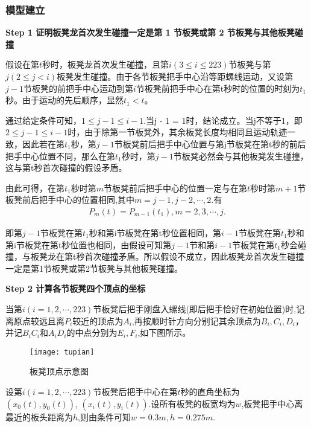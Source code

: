 \documentclass{cumcmthesis}
\begin{document}
\subsubsection{模型建立}
\noindent\textbf{Step 1 证明板凳龙首次发生碰撞一定是第 1 节板凳或第 2 节板凳与其他板凳碰撞}
 \par 假设在第$t$秒时，板凳龙首次发生碰撞，且第$i(3\leq i\leq 223)$节板凳与第$j(2\leq j<i)$板凳发生碰撞。由于各节板凳把手中心沿等距螺线运动，又设第$j-1$节板凳的前把手中心运动到第$i$节板凳前把手中心在第t秒时的位置的时刻为$t_1$秒。由于运动的先后顺序，显然$t_1<t$。
 \par 通过给定条件可知，$1\leq j-1\leq i-1$.当j - 1 = 1时，结论成立。当j不等于1，即$2\leq j-1\leq i-1$时，由于除第一节板凳外，其余板凳长度均相同且运动轨迹一致，因此若在第$t_{1}$秒，第$j - 1$节板凳前后把手中心位置与第j节板凳在第t秒的前后把手中心位置不同，那么在第$t_{1}$秒时，第$j - 1$节板凳必然会与其他板凳发生碰撞，这与第t秒首次碰撞的假设矛盾。
 \par 由此可得，在第$t_1$秒时第$m$节板凳前后把手中心的位置一定与在第$t$秒时第$m+1$节板凳前后把手中心的位置相同,其中$m=j-1,j-2,\cdots,2$.有
 \begin{align}\label{1.........18}
 P_m\left( t \right) =P_{m-1}\left( t_1 \right) ,m=2,3,\cdots ,j.
 \end{align}
 \par 即第$j - 1$节板凳在第$t_{1}$秒和第i节板凳在第t秒位置相同，第$i - 1$节板凳在第$t_{1}$秒和第i节板凳在第t秒位置也相同，由假设可知第$j - 1$节和第$i - 1$节板凳在第$t_{1}$秒会碰撞，与板凳龙在第t秒首次碰撞矛盾。所以假设不成立，因此板凳龙首次发生碰撞一定是第1节板凳或第2节板凳与其他板凳碰撞。

 \noindent\textbf{Step 2 计算各节板凳四个顶点的坐标}
 \par 当第$i(i=1,2,\cdots,223)$节板凳后把手刚盘入螺线(即后把手恰好在初始位置)时,记离原点较远且离$P_i$较近的顶点为$A_i$,再按顺时针方向分别记其余顶点为$B_i,C_i,D_i$，并记$B_iC_i$和$A_iD_i$的中点分别为$E_i,F_i$,如下图所示。
 \begin{figure}[!h]
    \centering
    \texttt{[image: tupian]}
    \caption{板凳顶点示意图}
    \label{fig:circuit-diagram}
\end{figure}
\par 设第$i(i=1,2,\cdots,223)$节板凳后把手中心在第$t$秒的直角坐标为$(x_0(t),y_0(t))$,
$(x_i(t),y_i(t))$.设所有板凳的板宽均为$w$,板凳把手中心离最近的板头距离为$h$,则由条件可知$w=0.3m,h=0.275m$.
\end{document}

